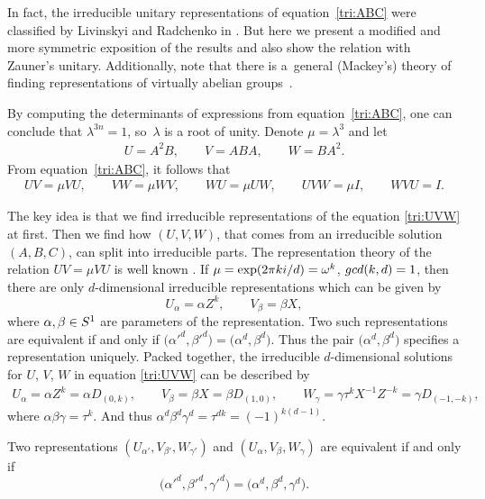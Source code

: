 \documentclass[11pt]{article}
\numberwithin{equation}{section}
\numberwithin{equation}{section}
\newcommand{\ea}[1]{\begin{align}#1\end{align}}
\begin{document}
In fact, the irreducible unitary representations of equation~\eqref{tri:ABC} were
classified by Livinskyi and Radchenko in \cite{RL}. But here we present a modified and more
symmetric exposition of the results and also show the relation with Zauner's unitary.
Additionally, note that there is a~general (Mackey's) theory of finding representations
of virtually abelian groups~\cite{Kyr}.

By computing the determinants of expressions from equation~\eqref{tri:ABC}, one can conclude that $\lambda^{3n} = 1$,
so~$\lambda$ is a root of unity.
Denote $\mu = \lambda^3$ and let
\begin{align*}
U = A^2B,
\qquad
V = ABA,
\qquad
W = BA^2.
\end{align*}
From equation~\eqref{tri:ABC}, it follows that
\ea{ \label{tri:UVW}
UV = \mu VU,
\qquad
VW = \mu WV,
\qquad
WU = \mu UW,
\qquad
UVW = \mu I,
\qquad
WVU = I.
}

The key idea is that we find irreducible representations of the equation \eqref{tri:UVW}
at first.
Then we find how $(U,V,W)$, that comes from an irreducible solution $(A,B,C)$,
can split into irreducible parts.
The representation theory of the relation $UV=\mu VU$ is well known \cite{Davidson,Weyl}.
If $\mu = \exp (2\pi k{\rm i}/d)  = \omega^k$, ${\rm gcd}(k,d)=1$,
then there are only $d$-dimensional irreducible representations which can be given by
\[
U_\alpha = \alpha Z^k,
\qquad
V_\beta = \beta X,
\]
where $\alpha, \beta \in {\rm S}^1$ are parameters of the representation.
Two such representations are equivalent if and only if
$\bigl(\alpha'^d, \beta'^d\bigr) = \bigl(\alpha^d, \beta^d\bigr)$. Thus the pair $\bigl(\alpha^d, \beta^d\bigr)$
specifies a representation uniquely.
Packed together, the irreducible $d$-dimensional solutions for $U$, $V$, $W$ in equation \eqref{tri:UVW}
can be described by
\begin{gather}
  U_\alpha = \alpha Z^k = \alpha D_{(0,k)},\qquad V_\beta = \beta X = \beta D_{(1,0)}, \qquad
 W_\gamma = \gamma \tau^k X^{-1}Z^{-k} = \gamma D_{(-1,-k)},\label{tri:UVWsol}
\end{gather}
where $\alpha \beta \gamma = \tau^k$.
And thus $\alpha^d \beta^d \gamma^d = \tau^{dk} = (-1)^{k(d-1)}$.

Two representations $(U_{\alpha'}, V_{\beta'}, W_{\gamma'})$ and $(U_\alpha, V_\beta, W_\gamma)$
are equivalent if and only if
\[
\bigl(\alpha'^d, \beta'^d, \gamma'^d\bigr) =\allowbreak \bigl(\alpha^d, \beta^d, \gamma^d\bigr).
\]
\end{document}
